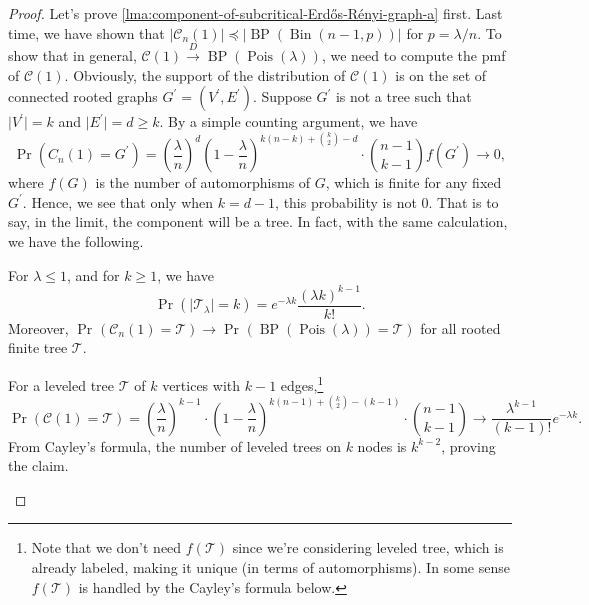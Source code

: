 \begin{proof}
	Let's prove \autoref{lma:component-of-subcritical-Erdős-Rényi-graph-a} first. Last time, we have shown that \(\lvert \mathcal{C} _n(1) \rvert \preceq \lvert \operatorname{BP} (\operatorname{Bin}(n-1, p) )\rvert \) for \(p = \lambda /n\). To show that in general, \(\mathcal{C} (1) \overset{D}{\to} \operatorname{BP}(\operatorname{Pois}(\lambda ) ) \), we need to compute the pmf of \(\mathcal{C} (1)\). Obviously, the support of the distribution of \(\mathcal{C} (1)\) is on the set of connected rooted graphs \(G^{\prime}  = (V^{\prime} , E^{\prime} )\). Suppose \(G^{\prime} \) is not a tree such that \(\lvert V^{\prime} \rvert = k\) and \(\lvert E^{\prime} \rvert = d \geq k\). By a simple counting argument, we have
	\[
		\Pr_{}(C_n(1) = G^{\prime} )
		= \left( \frac{\lambda }{n} \right) ^d \left( 1 - \frac{\lambda}{n} \right) ^{k (n-k) + \binom{k}{2} - d} \cdot \binom{n-1}{k-1} f(G^{\prime} )
		\to 0,
	\]
	where \(f(G)\) is the number of automorphisms of \(G\), which is finite for any fixed \(G^{\prime} \). Hence, we see that only when \(k = d-1\), this probability is not \(0\). That is to say, in the limit, the component will be a tree. In fact, with the same calculation, we have the following.

	\begin{claim}
		For \(\lambda \leq 1\), and for \(k \geq 1\), we have
		\[
			\Pr_{}(\lvert \mathcal{T} _\lambda \rvert = k)
			= e^{-\lambda k} \frac{(\lambda k)^{k-1}}{k!}.
		\]
		Moreover, \(\Pr_{}(\mathcal{C} _n(1) = \mathcal{T} ) \to \Pr_{}(\operatorname{BP}(\operatorname{Pois}(\lambda ) ) = \mathcal{T} ) \) for all rooted finite tree \(\mathcal{T} \).
	\end{claim}
	\begin{explanation}
		For a leveled tree \(\mathcal{T} \) of \(k\) vertices with \(k-1\) edges,\footnote{Note that we don't need \(f(\mathcal{T} )\) since we're considering leveled tree, which is already labeled, making it unique (in terms of automorphisms). In some sense \(f(\mathcal{T} )\) is handled by the Cayley's formula below.}
		\[
			\Pr_{}(\mathcal{C} (1) = \mathcal{T} )
			= \left( \frac{\lambda}{n} \right) ^{k-1} \cdot \left( 1 - \frac{\lambda}{n} \right) ^{k(n-1) + \binom{k}{2}  - (k-1)} \cdot \binom{n-1}{k-1}
			\to \frac{\lambda ^{k-1}}{(k-1)!} e^{-\lambda k}.
		\]
		From Cayley's formula, the number of leveled trees on \(k\) nodes is \(k^{k-2}\), proving the claim.
	\end{explanation}


\end{proof}
